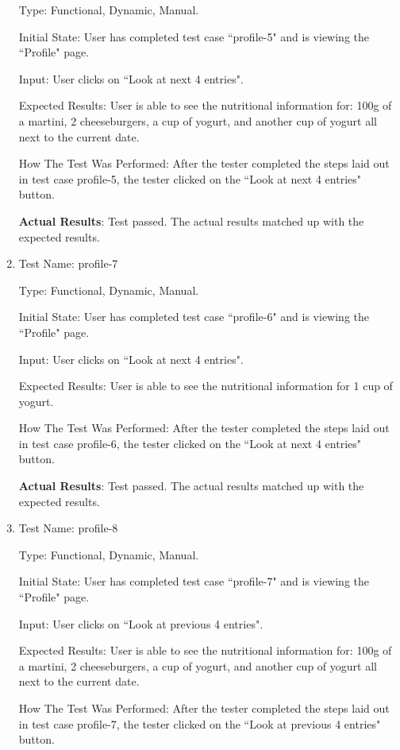 \documentclass[12pt, titlepage]{article}
\begin{document}
\begin{enumerate}
		Type: Functional, Dynamic, Manual.
		
		Initial State: User has completed test case ``profile-5" and is viewing the ``Profile" page.
		
		Input: User clicks on ``Look at next 4 entries".
		
		Expected Results: User is able to see the nutritional information for: 100g of a martini, 2 cheeseburgers, a cup of yogurt, and another cup of yogurt all next to the current date.
		
		How The Test Was Performed: After the tester completed the steps laid out in test case profile-5, the tester clicked on the ``Look at next 4 entries" button.
		
		\textbf{Actual Results}: Test passed. The actual results matched up with the expected results.
		
		\item{Test Name: profile-7}
		
		Type: Functional, Dynamic, Manual.
		
		Initial State: User has completed test case ``profile-6" and is viewing the ``Profile" page.
		
		Input: User clicks on ``Look at next 4 entries".
		
		Expected Results: User is able to see the nutritional information for 1 cup of yogurt.
		
		How The Test Was Performed: After the tester completed the steps laid out in test case profile-6, the tester clicked on the ``Look at next 4 entries" button.
		
		\textbf{Actual Results}: Test passed. The actual results matched up with the expected results.
		
		\item{Test Name: profile-8}
		
		Type: Functional, Dynamic, Manual.
		
		Initial State: User has completed test case ``profile-7" and is viewing the ``Profile" page.
		
		Input: User clicks on ``Look at previous 4 entries".
		
		Expected Results: User is able to see the nutritional information for: 100g of a martini, 2 cheeseburgers, a cup of yogurt, and another cup of yogurt all next to the current date.
		
		How The Test Was Performed: After the tester completed the steps laid out in test case profile-7, the tester clicked on the ``Look at previous 4 entries" button.
		

\end{enumerate}
\end{document}
